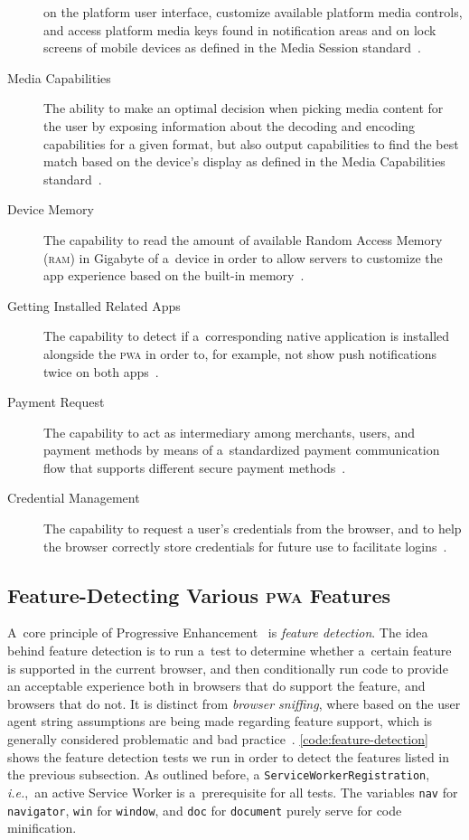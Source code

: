 \documentclass[sigconf]{acmart}
\begin{document}
\begin{description}
    on the platform user interface, customize available platform media controls,
    and access platform media keys found in notification areas
    and on lock screens of mobile devices
    as defined in the Media Session standard~\cite{lamouri2017mediasessionapi}.
  \item[Media Capabilities] The ability to make an optimal decision
    when picking media content for the user by exposing information
    about the decoding and encoding capabilities for a given format,
    but also output capabilities to find the best match based on the device's display
    as defined in the Media Capabilities standard~\cite{lamouri2017mediacapabilities}.
  \item[Device Memory] The capability to read the amount of available
    Random Access Memory (\textsc{ram}) in Gigabyte
    of a~device in order to allow servers to customize the app experience
    based on the built-in memory~\cite{panicker2017devicememory}.
  \item[Getting Installed Related Apps] The capability to detect if a~corresponding
    native application is installed alongside the \textsc{pwa} in order to,
    for example, not show push notifications twice on both apps~\cite{kinlan2017relatedapps}.
  \item[Payment Request] The capability to act as intermediary among merchants,
    users, and payment methods by means of a~standardized payment communication flow
    that supports different secure payment methods~\cite{bateman2017paymentrequest}.
  \item[Credential Management] The capability to request a user's credentials
    from the browser, and to help the browser correctly store credentials
    for future use to facilitate logins~\cite{west2017credentialmanagement}.
\end{description} 

\subsection{Feature-Detecting Various \textsc{pwa} Features}

A~core principle of Progressive Enhancement~\cite{champeon2003progressiveenhancement}
is \emph{feature detection}.
The idea behind feature detection is to run a~test to determine
whether a~certain feature is supported in the current browser,
and then conditionally run code to provide an acceptable experience
both in browsers that do support the feature, and browsers that do not.
It is distinct from \emph{browser sniffing}, where based on the user agent string
assumptions are being made regarding feature support,
which is generally considered problematic and bad practice~\cite{andersen2008useragent}.
\autoref{code:feature-detection} shows the feature detection tests
we run in order to detect the features listed in the previous subsection.
As outlined before, a \texttt{ServiceWorkerRegistration},
\emph{i.e.},\ an active Service Worker is a~prerequisite for all tests.  
The variables \texttt{nav} for \texttt{navigator},
\texttt{win} for \texttt{window}, and \texttt{doc} for \texttt{document}
purely serve for code minification.
\end{document}
